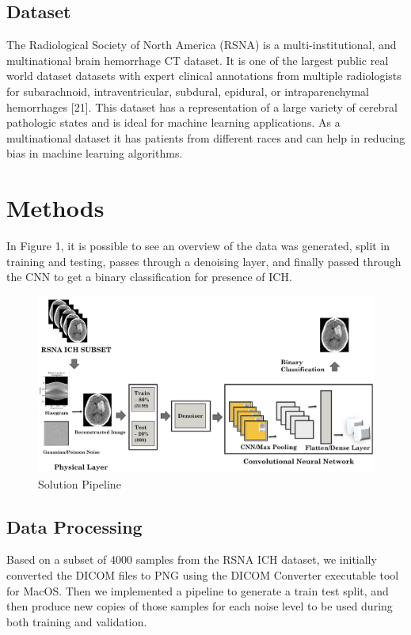 \documentclass{article}
\begin{document}
\subsection{Dataset}

\begin{par}
    The Radiological Society of North America (RSNA) is a multi-institutional, and multinational brain hemorrhage CT dataset. It is one of the largest public real world dataset datasets with expert clinical annotations from multiple radiologists for subarachnoid, intraventricular, subdural, epidural, or intraparenchymal hemorrhages [21]. This dataset has a representation of a large variety of cerebral pathologic states and is ideal for machine learning applications. As a multinational dataset it has patients from different races and can help in reducing bias in machine learning algorithms.
\end{par}

\section{Methods}

In Figure 1, it is possible to see an overview of the data was generated, split in training and testing, passes through a denoising layer, and finally passed through the CNN to get a binary classification for presence of ICH.

\begin{figure}[h]
    \centering
    \includegraphics[width=1\textwidth]{pipeline.png}
    \caption{Solution Pipeline} 
\end{figure}

\subsection{Data Processing}
\begin{par}
    Based on a subset of 4000 samples from the RSNA ICH dataset, we initially converted the DICOM files to PNG using the DICOM Converter executable tool for MacOS. Then we implemented a pipeline to generate a train test split, and then produce new copies of those samples for each noise level to be used during both training and validation.
\end{par}
\end{document}
